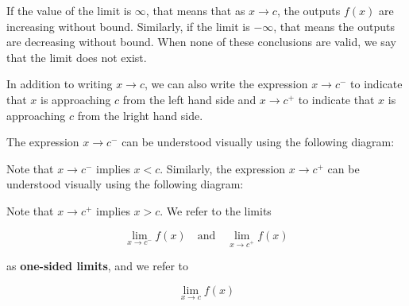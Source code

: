 \documentclass{ximera}
\begin{document}
If the value of the limit is $\infty$, that means that as $x \to c$, the outputs $f(x)$ are increasing without bound.  Similarly, if the limit is $-\infty$, that means the outputs are decreasing without bound.
When none of these conclusions are valid, we say that the limit does not exist. 

In addition to writing $x \to c$, we can also write the expression
$x \to c^-$ to indicate that $x$ is approaching $c$ from the left hand side and $x \to c^+$ to 
indicate that $x$ is approaching $c$ from the lright hand side.

The expression $x \to c^-$ can be understood visually using the following diagram:




\begin{center}

\end{center}

Note that $x \to c^-$ implies $x < c$.
Similarly, the expression $x \to c^+$ can be understood visually using the following diagram:



\begin{center}
\end{center}

Note that $x \to c^+$ implies $x > c$. We refer to the limits

\[\lim_{x \to c^-} f(x)  \quad \text{and} \quad \lim_{x \to c^+} f(x) \]

as \textbf{one-sided limits}, and we refer to 

\[\lim_{x \to c} f(x) \]
\end{document}
